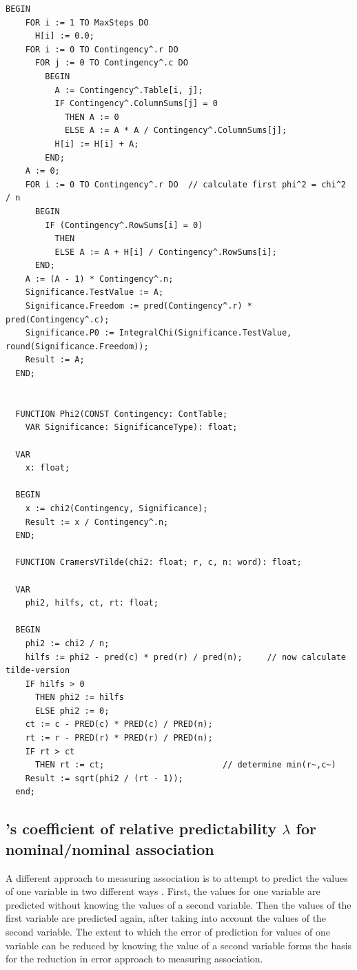 \begin{refsection}
\begin{lstlisting}[caption=Common correlation measures without PRE-interpretation for enumeration types]
  BEGIN
    FOR i := 1 TO MaxSteps DO
      H[i] := 0.0;
    FOR i := 0 TO Contingency^.r DO
      FOR j := 0 TO Contingency^.c DO
        BEGIN
          A := Contingency^.Table[i, j];
          IF Contingency^.ColumnSums[j] = 0
            THEN A := 0
            ELSE A := A * A / Contingency^.ColumnSums[j];
          H[i] := H[i] + A;
        END;
    A := 0;
    FOR i := 0 TO Contingency^.r DO  // calculate first phi^2 = chi^2 / n
      BEGIN
        IF (Contingency^.RowSums[i] = 0)
          THEN
          ELSE A := A + H[i] / Contingency^.RowSums[i];
      END;
    A := (A - 1) * Contingency^.n;
    Significance.TestValue := A;
    Significance.Freedom := pred(Contingency^.r) * pred(Contingency^.c);
    Significance.P0 := IntegralChi(Significance.TestValue, round(Significance.Freedom));
    Result := A;
  END;


  FUNCTION Phi2(CONST Contingency: ContTable;
    VAR Significance: SignificanceType): float;

  VAR
    x: float;

  BEGIN
    x := chi2(Contingency, Significance);
    Result := x / Contingency^.n;
  END;

  FUNCTION CramersVTilde(chi2: float; r, c, n: word): float;

  VAR
    phi2, hilfs, ct, rt: float;

  BEGIN
    phi2 := chi2 / n;
    hilfs := phi2 - pred(c) * pred(r) / pred(n);     // now calculate tilde-version
    IF hilfs > 0
      THEN phi2 := hilfs
      ELSE phi2 := 0;
    ct := c - PRED(c) * PRED(c) / PRED(n);
    rt := r - PRED(r) * PRED(r) / PRED(n);
    IF rt > ct
      THEN rt := ct;                        // determine min(r~,c~)
    Result := sqrt(phi2 / (rt - 1));
  end;
\end{lstlisting}

\subsection{'s coefficient of relative predictability \(\lambda \) for nominal/nominal association}

A different approach to measuring association is to attempt to predict the values of one variable in two different ways \parencite{Gut-41,Gin-06,Goo-54}. First, the values for one variable are predicted without knowing the values of a second variable. Then the values of the first variable are predicted again, after taking into account the values of the second variable. The extent to which the error of prediction for values of one variable can be reduced by knowing the value of a second variable forms the basis for the reduction in error approach to measuring association.


\end{refsection}
